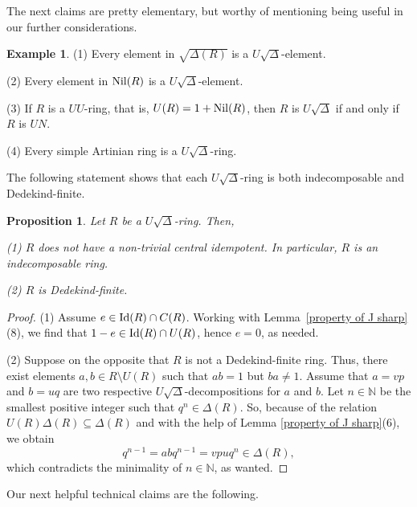 \documentclass[11pt]{amsart}
\newtheorem{proposition}[theorem]{Proposition}
\theoremstyle{definition}
\newtheorem{example}[theorem]{Example}
\begin{document}
The next claims are pretty elementary, but worthy of mentioning being useful in our further considerations.

\begin{example}

(1) Every element in $\sqrt{\Delta(R)}$ is a $U\sqrt{\Delta}$-element.
		
(2) Every element in ${\rm Nil}(R)$ is a $U\sqrt{\Delta}$-element.
		
(3) If $R$ is a $UU$-ring, that is, $U(R)=1+{\rm Nil}(R)$, then $R$ is $U\sqrt{\Delta}$ if and only if $R$ is $UN$.
		
(4) Every simple Artinian ring is a $U\sqrt{\Delta}$-ring.
\end{example}


The following statement shows that each $U\sqrt{\Delta}$-ring is both indecomposable and Dedekind-finite.

\begin{proposition}\label{indecomposable}
Let \( R \) be a \( U\sqrt{\Delta} \)-ring. Then,

(1) \( R \) does not have a non-trivial central idempotent. In particular, \( R \) is an indecomposable ring.

(2) \( R \) is Dedekind-finite.
\end{proposition}

\begin{proof}
(1) Assume \( e \in {\rm Id}(R) \cap C(R) \). Working with Lemma~\ref{property of J sharp}(8), we find that \( 1 - e \in {\rm Id}(R) \cap U(R) \), hence \( e = 0 \), as needed.

(2) Suppose on the opposite that $R$ is not a Dedekind-finite ring. Thus, there exist elements $a, b \in R \setminus U(R)$ such that $ab = 1$ but $ba \neq 1$. Assume that $a = vp$ and $b = uq$ are two respective $U\sqrt{\Delta}$-decompositions for $a$ and $b$. Let $n \in \mathbb{N}$ be the smallest positive integer such that $q^n \in \Delta(R)$. So, because of the relation $U(R)\Delta(R) \subseteq \Delta(R)$ and with the help of Lemma \ref{property of J sharp}(6), we obtain
\[
q^{n-1} = abq^{n-1} = vpuq^n \in \Delta(R),
\]
which contradicts the minimality of $n \in \mathbb{N}$, as wanted.
\end{proof}


Our next helpful technical claims are the following.
\end{document}
